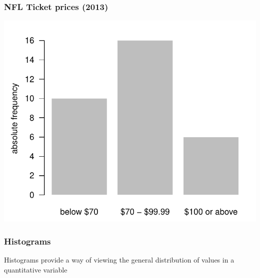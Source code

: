 \documentclass[12pt]{beamer}\usepackage[]{graphicx}\usepackage[]{color}
\newenvironment{knitrout}{}{} %
\begin{document}

\begin{frame}[fragile]
\frametitle{NFL Ticket prices (2013)}
\begin{knitrout}\footnotesize
{}\color{fgcolor}

{\centering \includegraphics[width=.7\linewidth,height=.6\linewidth]{figure/unnamed-chunk-17-1} 

}



\end{knitrout}

\end{frame}


\begin{frame}
\begin{center}
\Huge{}
\end{center}
\end{frame}


\begin{frame}
\frametitle{Histograms}
Histograms provide a way of viewing the general distribution of values in a quantitative variable
\end{frame}

\end{document}
